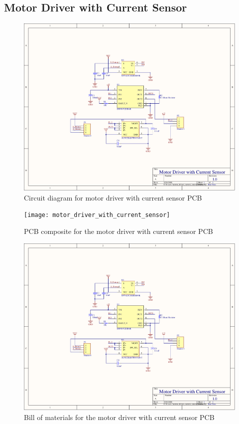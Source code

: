 \begin{flushleft}
\section{Motor Driver with Current Sensor}
\end{flushleft}
\label{app:motor_driver_current}
\begin{figure}[H]
	\centering
	\includegraphics[page=1,scale=0.8,angle=270]{PDFs/motor_driver_with_current_sensor.PDF} 
	\caption{Circuit diagram for motor driver with current sensor PCB}
	\label{fig:motor_driver_current_circuit}
\end{figure}
\newpage
\begin{figure}[H]
	\centering
	\texttt{[image: motor\_driver\_with\_current\_sensor]} 
	\caption{PCB composite for the motor driver with current sensor PCB}
	\label{fig:motor_driver_current_pcb}
\end{figure}
\begin{figure}[H]
	\centering
	\includegraphics[page=3,width=\textwidth]{PDFs/motor_driver_with_current_sensor.PDF} 
	\caption{Bill of materials for the motor driver with current sensor PCB}
	\label{fig:motor_driver_current_bom}
\end{figure}